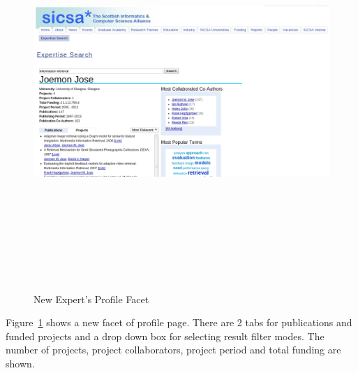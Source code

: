  \begin{figure}
 \centering
 \includegraphics[width=13cm,height=15cm,keepaspectratio]{./figures/newProfilePagePublication.png}
 \caption{New Expert's Profile Facet} \label{fig:newProfilePage} 
 \end{figure}
 Figure~\ref{fig:newProfilePage} shows a new facet of profile page. There are 2 tabs for publications and funded projects and a drop down box for selecting
 result filter modes. The number of projects, project collaborators, project period and total funding are shown.
 
